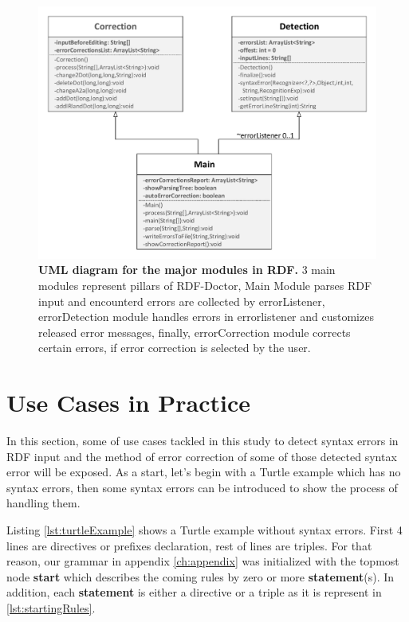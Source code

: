 	\begin{figure}[ht]
	\begin{center}
		\includegraphics[scale=0.65,angle=0]{images/modules.pdf}
		\setlength{\abovecaptionskip}{0pt} 
				\setlength\belowcaptionskip{-5mm}
		\caption{\textbf{UML diagram for the major modules in RDF.} 3 main modules represent pillars of RDF-Doctor, Main Module parses RDF input and encounterd errors are collected by errorListener, errorDetection module handles  errors in errorlistener and customizes  released error messages, finally, errorCorrection module corrects certain errors, if error correction is selected by the user.}
		\label{Fig:UML}
	\end{center}
\end{figure}
\vspace{-5mm}

\section{Use Cases in Practice}
In this section, some of use cases tackled in this study to detect syntax errors in RDF input and  the method of error correction of some of those detected syntax error will be exposed. As a start, let's begin with a Turtle example which has no syntax errors, then some syntax errors can be introduced to show the process of handling them. 
	\vspace{5mm} %

Listing \ref{lst:turtleExample} shows a Turtle example without syntax errors. First 4 lines are directives or prefixes declaration, rest of lines are triples.  For that reason, our grammar in appendix \ref{ch:appendix} was initialized with the topmost node \textbf{start}  which describes the coming rules by zero or more  \textbf{statement}(s). In addition, each \textbf{statement} is either a directive or a triple as it is represent in \ref{lst:startingRules}.


